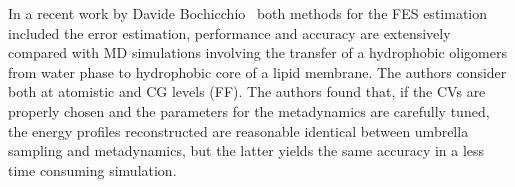 In a recent work by Davide Bochicchio \etal\, \cite{metaUSComparison} both methods for the \ac{FES} estimation included the error estimation, performance and accuracy are extensively compared with \ac{MD} simulations involving the transfer of a hydrophobic oligomers from water phase to hydrophobic core of a lipid membrane. The authors consider both at atomistic and \ac{CG} levels (\martini \ac{FF}). The authors found that, if the \acp{CV} are properly chosen and the parameters for the metadynamics are carefully tuned, the energy profiles reconstructed are reasonable identical between umbrella sampling and metadynamics, but the latter yields the same accuracy in a less time consuming simulation.  


